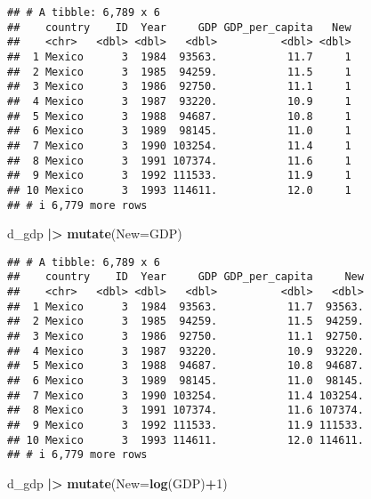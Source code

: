 \documentclass[
]{article}
\newenvironment{Shaded}{\begin{snugshade}}{\end{snugshade}}
\newcommand{\AttributeTok}[1]{\textcolor[rgb]{0.13,0.29,0.53}{#1}}
\newcommand{\DecValTok}[1]{\textcolor[rgb]{0.00,0.00,0.81}{#1}}
\newcommand{\FunctionTok}[1]{\textcolor[rgb]{0.13,0.29,0.53}{\textbf{#1}}}
\newcommand{\NormalTok}[1]{#1}
\newcommand{\SpecialCharTok}[1]{\textcolor[rgb]{0.81,0.36,0.00}{\textbf{#1}}}
\begin{document}
\begin{verbatim}
## # A tibble: 6,789 x 6
##    country    ID  Year     GDP GDP_per_capita   New
##    <chr>   <dbl> <dbl>   <dbl>          <dbl> <dbl>
##  1 Mexico      3  1984  93563.           11.7     1
##  2 Mexico      3  1985  94259.           11.5     1
##  3 Mexico      3  1986  92750.           11.1     1
##  4 Mexico      3  1987  93220.           10.9     1
##  5 Mexico      3  1988  94687.           10.8     1
##  6 Mexico      3  1989  98145.           11.0     1
##  7 Mexico      3  1990 103254.           11.4     1
##  8 Mexico      3  1991 107374.           11.6     1
##  9 Mexico      3  1992 111533.           11.9     1
## 10 Mexico      3  1993 114611.           12.0     1
## # i 6,779 more rows
\end{verbatim}

\begin{Shaded}
\begin{Highlighting}[]
\NormalTok{d\_gdp }\SpecialCharTok{|\textgreater{}} \FunctionTok{mutate}\NormalTok{(}\AttributeTok{New=}\NormalTok{GDP)}
\end{Highlighting}
\end{Shaded}

\begin{verbatim}
## # A tibble: 6,789 x 6
##    country    ID  Year     GDP GDP_per_capita     New
##    <chr>   <dbl> <dbl>   <dbl>          <dbl>   <dbl>
##  1 Mexico      3  1984  93563.           11.7  93563.
##  2 Mexico      3  1985  94259.           11.5  94259.
##  3 Mexico      3  1986  92750.           11.1  92750.
##  4 Mexico      3  1987  93220.           10.9  93220.
##  5 Mexico      3  1988  94687.           10.8  94687.
##  6 Mexico      3  1989  98145.           11.0  98145.
##  7 Mexico      3  1990 103254.           11.4 103254.
##  8 Mexico      3  1991 107374.           11.6 107374.
##  9 Mexico      3  1992 111533.           11.9 111533.
## 10 Mexico      3  1993 114611.           12.0 114611.
## # i 6,779 more rows
\end{verbatim}

\begin{Shaded}
\begin{Highlighting}[]
\NormalTok{d\_gdp }\SpecialCharTok{|\textgreater{}} \FunctionTok{mutate}\NormalTok{(}\AttributeTok{New=}\FunctionTok{log}\NormalTok{(GDP)}\SpecialCharTok{+}\DecValTok{1}\NormalTok{)}
\end{Highlighting}
\end{Shaded}
\end{document}
